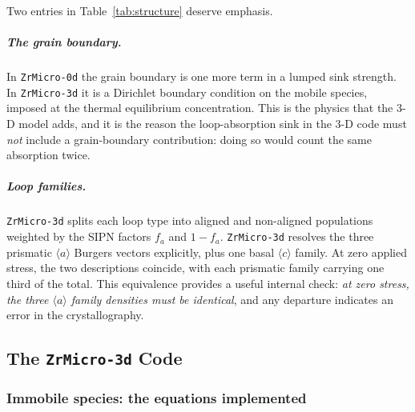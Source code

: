 \documentclass{article}
\newcommand{\aloop}{\ensuremath{\langle a\rangle}}
\newcommand{\cloop}{\ensuremath{\langle c\rangle}}
\newcommand{\ZrM}{\texttt{ZrMicro-3d}}
\newcommand{\ZrOd}{\texttt{ZrMicro-0d}}
\begin{document}
Two entries in Table~\ref{tab:structure} deserve emphasis.

\subparagraph{The grain boundary.} In \ZrOd{} the grain boundary is one more term in
a lumped sink strength. In \ZrM{} it is a Dirichlet boundary condition on the
mobile species, imposed at the thermal equilibrium concentration. This is the
physics that the 3-D model adds, and it is the reason the loop-absorption sink in the
3-D code must \emph{not} include a grain-boundary contribution: doing so would
count the same absorption twice.

\subparagraph{Loop families.} \ZrM{} splits each loop type into aligned and
non-aligned populations weighted by the SIPN factors $f_a$ and $1-f_a$. \ZrM{}
resolves the three prismatic \aloop{} Burgers vectors explicitly, plus one basal
\cloop{} family. At zero applied stress, the two descriptions coincide, with each
prismatic family carrying one third of the total. This equivalence provides a
useful internal check: \emph{at zero stress, the three \aloop{} family densities
must be identical}, and any departure indicates an error in the crystallography.

\subsection{The \ZrM{} Code}
\label{sec:zr3d}

\subsubsection{Immobile species: the equations implemented}
\end{document}
